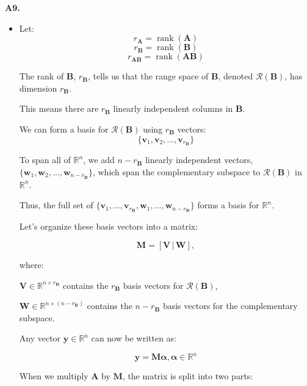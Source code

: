 \documentclass[12pt]{article}
\begin{document}
\textbf{A9.}
\vspace{\baselineskip}

\begin{itemize}
    \item Let:
\[ r_{\mathbf{A}} = \operatorname{rank}(\mathbf{A}) \]
\[r_{\mathbf{B}} = \operatorname{rank}(\mathbf{B}) \]
\[r_{\mathbf{AB}} = \operatorname{rank}(\mathbf{A}\mathbf{B}) \]


The rank of \( \mathbf{B} \), \( r_{\mathbf{B}} \), tells us that the range space of \( \mathbf{B} \), denoted \( \mathcal{R}(\mathbf{B}) \), has dimension \( r_{\mathbf{B}} \). 

This means there are \( r_{\mathbf{B}} \) linearly independent columns in \( \mathbf{B} \).
\vspace{\baselineskip}

We can form a basis for \( \mathcal{R}(\mathbf{B}) \) using \( r_{\mathbf{B}} \) vectors:
\[\{\mathbf{v}_1, \mathbf{v}_2, \dots, \mathbf{v}_{r_{\mathbf{B}}}\} \]

To span all of \( \mathbb{R}^n \), we add \( n - r_{\mathbf{B}} \) linearly independent vectors, \( \{\mathbf{w}_1, \mathbf{w}_2, \dots, \mathbf{w}_{n - r_{\mathbf{B}}}\} \), which span the complementary subspace to \( \mathcal{R}(\mathbf{B}) \) in \( \mathbb{R}^n \).

Thus, the full set of \( \{\mathbf{v}_1, \dots, \mathbf{v}_{r_{\mathbf{B}}}, \mathbf{w}_1, \dots, \mathbf{w}_{n - r_{\mathbf{B}}}\} \) forms a basis for \( \mathbb{R}^n \).
\vspace{\baselineskip}


Let’s organize these basis vectors into a matrix:

\[
\mathbf{M} = [\mathbf{V} \, | \, \mathbf{W}],
\]

where:

\( \mathbf{V} \in \mathbb{R}^{n \times r_{\mathbf{B}}} \) contains the \( r_{\mathbf{B}} \) basis vectors for \( \mathcal{R}(\mathbf{B}) \),

\( \mathbf{W} \in \mathbb{R}^{n \times (n - r_{\mathbf{B}})} \) contains the \( n - r_{\mathbf{B}} \) basis vectors for the complementary subspace.

Any vector \( \mathbf{y} \in \mathbb{R}^n \) can now be written as:

\[
\mathbf{y} = \mathbf{M} \boldsymbol{\alpha}, \boldsymbol{\alpha} \in \mathbb{R}^n
\]


When we multiply \( \mathbf{A} \) by \( \mathbf{M} \), the matrix is split into two parts:


\end{itemize}
\end{document}
